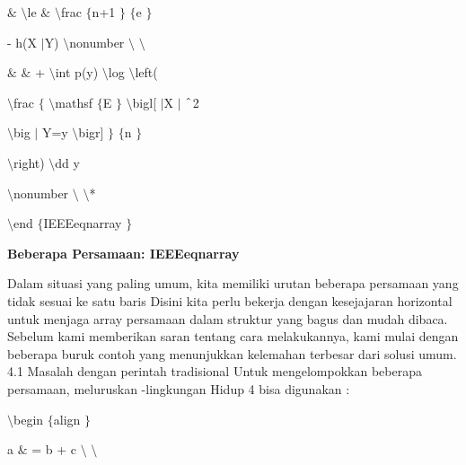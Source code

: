 \noindent 
 $  \&  $  $  \setminus  $le  $  \&  $  $  \setminus  $frac $  \{  $n+1 $  \}  $ $  \{  $e $  \}  $ \par
\vspace{12pt}
\noindent 
- h(X $  \vert  $Y)  $  \setminus  $nonumber $  \setminus  $ $  \setminus  $ \par
\vspace{12pt}
\noindent 
 $  \&  $ $  \&  $ +  $  \setminus  $int p(y)  $  \setminus  $log  $  \setminus  $left( \par
\vspace{12pt}
\noindent 
 $  \setminus  $frac $  \{  $ $  \setminus  $mathsf $  \{  $E $  \}  $ $  \setminus  $bigl[ $  \vert  $X $  \vert  $ $  \string^  $2 \par
\vspace{12pt}
\noindent 
 $  \setminus  $big $  \vert  $ Y=y $  \setminus  $bigr] $  \}  $ $  \{  $n $  \}  $ \par
\vspace{12pt}
\noindent 
 $  \setminus  $right)  $  \setminus  $dd y \par
\vspace{12pt}
\noindent 
 $  \setminus  $nonumber $  \setminus  $ $  \setminus  $* \par
\vspace{12pt}
\noindent 
 $  \setminus  $end $  \{  $IEEEeqnarray $  \}  $ \par
\vspace{12pt}
\vspace{12pt}
\noindent 
\textbf{Beberapa Persamaan: IEEEeqnarray} \par
\noindent 
 \hspace*{0.5in} Dalam situasi yang paling umum, kita memiliki urutan beberapa persamaan yang tidak sesuai ke satu baris Disini kita perlu bekerja dengan kesejajaran horizontal untuk menjaga array persamaan dalam struktur yang bagus dan mudah dibaca. Sebelum kami memberikan saran tentang cara melakukannya, kami mulai dengan beberapa buruk contoh yang menunjukkan kelemahan terbesar dari solusi umum. 4.1 Masalah dengan perintah tradisional Untuk mengelompokkan beberapa persamaan, meluruskan -lingkungan Hidup 4 bisa digunakan : \par
\vspace{12pt}
\noindent 
 $  \setminus  $begin $  \{  $align $  \}  $ \par
\vspace{12pt}
\noindent 
a  $  \&  $ = b + c  $  \setminus  $ $  \setminus  $ \par
